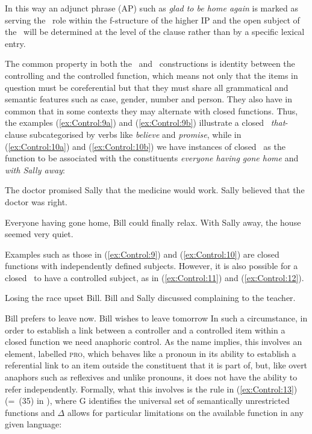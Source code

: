 \documentclass[output=paper,hidelinks]{langscibook}
\begin{document}
 \ea\label{ex:Control:8}
\z
In this way an adjunct phrase (AP) such as \emph{glad to be home again} is marked as serving the \XADJ\ role within the f-structure of the higher IP and the open subject of the \XADJ\ will be determined at the level of the clause rather than by a specific lexical entry.

 The common property in both the \XCOMP\ and \XADJ\ constructions is identity between the controlling and the controlled function, which means not only that the items in question must be coreferential but that they must share all grammatical and semantic features such as case, gender, number and person. They also have in common that in some contexts they may alternate with closed functions. Thus, the examples (\ref{ex:Control:9a}) and (\ref{ex:Control:9b}) illustrate a closed \COMP\ \emph{that}-clause subcategorised by verbs like \emph{believe} and \emph{promise}, while in (\ref{ex:Control:10a}) and (\ref{ex:Control:10b}) we have instances of closed \ADJ\ as the function to be associated with the constituents \emph{everyone having gone home} and \emph{with Sally away}:

 \ea\label{ex:Control:9}
 \ea\label{ex:Control:9a} The doctor promised Sally that the medicine would work.
\ex\label{ex:Control:9b} Sally believed that the doctor was right.
\z\z

\ea\label{ex:Control:10}
\ea\label{ex:Control:10a} Everyone having gone home, Bill could finally relax.
\ex\label{ex:Control:10b} With Sally away, the house seemed very quiet.
\z\z
 
Examples such as those in (\ref{ex:Control:9}) and (\ref{ex:Control:10}) are closed functions with independently defined subjects. However, it is also possible for a closed \COMP\ to have a controlled subject, as in (\ref{ex:Control:11}) and (\ref{ex:Control:12}).

\ea\label{ex:Control:11}
\ea\label{ex:Control:11a} Losing the race upset Bill.
\ex\label{ex:Control:11b} Bill and Sally discussed complaining to the teacher.
\z\z
 
\ea\label{ex:Control:12}
 \ea\label{ex:Control:12a} Bill prefers to leave now. 
 \ex\label{ex:Control:12b} Bill wishes to leave tomorrow
\z\z
In such a circumstance, in order to establish a link between a controller and a controlled item within a closed function we need anaphoric control. As the name implies, this involves an element, labelled \textsc{pro}, which behaves like a pronoun in its ability to establish a referential link to an item outside the constituent that it is part of, but, like overt anaphors such as reflexives and unlike pronouns, it does not have the ability to refer independently. Formally, what this involves is the rule in (\ref{ex:Control:13}) (=~(35) in \citealt[326]{bresnan1982control-complementation}), where G identifies the universal set of semantically unrestricted functions and $\Delta$ allows for particular limitations on the available function in any given language:
\end{document}
